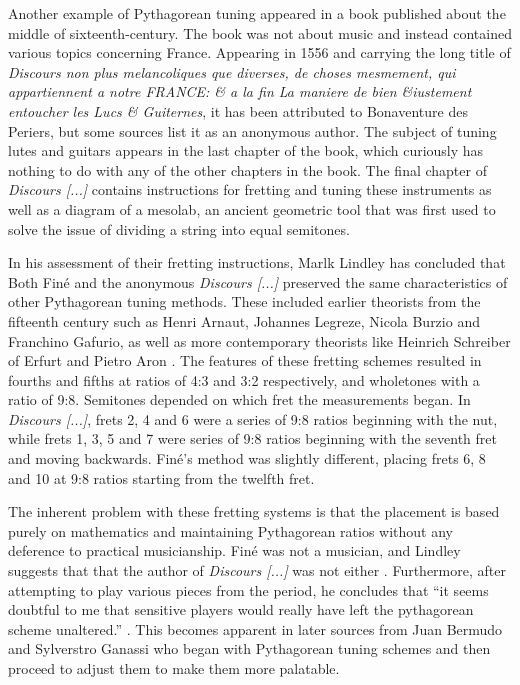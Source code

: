 Another example of Pythagorean tuning appeared in a book published about the middle of
sixteenth-century.  The book was not about music and instead contained various topics
concerning France.  Appearing in 1556 and carrying the long title of \textit{Discours non
plus melancoliques que diverses, de choses mesmement, qui appartiennent a notre FRANCE: \&
a la fin La maniere de bien \&iustement entoucher les Lucs \& Guiternes}, it has been
attributed to Bonaventure des Periers, but some sources list it as an anonymous author.
The subject of tuning lutes and guitars appears in the last chapter of the book, which
curiously has nothing to do with any of the other chapters in the book. The final chapter
of \textit{Discours [...]} contains instructions for fretting and tuning these instruments
as well as a diagram of a mesolab, an ancient geometric tool that was first used to solve
the issue of dividing a string into equal semitones.

In his assessment of their fretting instructions, Marlk Lindley has concluded that Both
Fin\'{e} and the anonymous \textit{Discours [...]}  preserved the same characteristics of
other Pythagorean tuning methods.  These included earlier theorists from the fifteenth
century such as Henri Arnaut, Johannes Legreze, Nicola Burzio and Franchino Gafurio, as
well as more contemporary theorists like Heinrich Schreiber of Erfurt and Pietro Aron
\autocite[11]{ML:1}. The features of these fretting schemes resulted in fourths and fifths
at ratios of 4:3 and 3:2 respectively, and wholetones with a ratio of 9:8.  Semitones
depended on which fret the measurements began.  In \textit{Discours [...]}, frets 2, 4 and
6 were a series of 9:8 ratios beginning with the nut, while frets 1, 3, 5 and 7 were
series of 9:8 ratios beginning with the seventh fret and moving backwards.  Fin\'{e}'s
method was slightly different, placing frets 6, 8 and 10 at 9:8 ratios starting from the
twelfth fret.

The inherent problem with these fretting systems is that the placement is based purely on
mathematics and maintaining Pythagorean ratios without any deference to practical
musicianship. Fin\'{e} was not a musician, and Lindley suggests that that the author of
\textit{Discours [...]} was not either \autocite[11]{ML:1}.  Furthermore, after attempting
to play various pieces from the period, he concludes that ``it seems doubtful to me that
sensitive players would really have left the pythagorean scheme unaltered.''
\autocite[13]{ML:1}.  This becomes apparent in later sources from Juan Bermudo and
Sylverstro Ganassi who began with Pythagorean tuning schemes and then proceed to adjust
them to make them more palatable.

